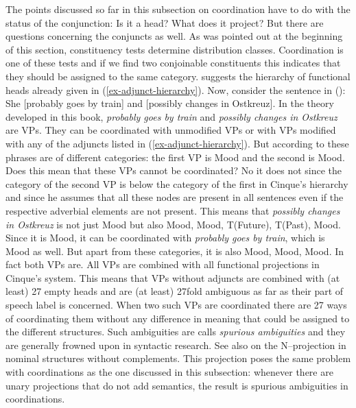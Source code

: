 The points discussed so far in this subsection on coordination have to do with the status of the
conjunction: Is it a head? What does it project? But there are questions concerning the conjuncts as
well. As was pointed out at the beginning of this section, constituency tests determine distribution
classes. Coordination is one of these tests and if we find two conjoinable constituents this
indicates that they should be assigned to the same category.
\citet[]{Cinque99a-u} suggests the hierarchy of functional heads already given in (\ref{ex-adjunct-hierarchy}).
Now, consider the sentence in ():
\ea
She [probably goes by train] and [possibly changes in Ostkreuz].
\z
\largerpage
In the theory developed in this book, \emph{probably goes by train} and \emph{possibly changes in
  Ostkreuz} are VPs. They can be coordinated with unmodified VPs or with VPs modified with any of
the adjuncts listed in (\ref{ex-adjunct-hierarchy}). But according to \citeauthor{Cinque99a-u} these phrases
are of different categories: the first VP is Mood and the second is
Mood. Does this mean that these VPs cannot be coordinated? No it does not since the
category of the second VP is below the category of the first in Cinque's hierarchy and since he
assumes that all these nodes are present in all sentences even if the respective adverbial elements
are not present. This means that \emph{possibly changes in Ostkreuz} is not just
Mood but also Mood, Mood, T(Future), T(Past),
Mood. Since it is Mood, it can be coordinated with \emph{probably goes
  by train}, which is Mood as well. But apart from these categories, it is also
Mood, Mood, Mood. In fact both VPs are. All VPs are
combined with all functional projections in Cinque's system. This means that VPs without adjuncts
are combined with (at least) 27 empty heads and are (at least) 27fold ambiguous as far as their part
of speech label is concerned. When two such VPs are
coordinated there are 27 ways of coordinating them without any difference in meaning that could be
assigned to the different structures. Such ambiguities are calls \emph{spurious ambiguities} and
they are generally frowned upon in syntactic research. See also  on the
N–\nbar projection in nominal structures without complements. This projection poses the same problem
with coordinations as the one discussed in this subsection: whenever there are unary projections
that do not add semantics, the result is spurious ambiguities in coordinations.%

